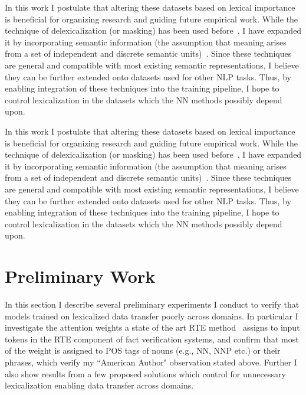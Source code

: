 \documentclass[compsoc,onecolumn]{IEEEtran}
\begin{document}
 
In this work I postulate that altering these datasets based on lexical importance is beneficial for organizing research and guiding future empirical work. While the technique of delexicalization (or masking) has been used before~\citep*{zeman2008cross}, I have expanded it by incorporating semantic information (the assumption that meaning arises from a set of independent and discrete semantic units)~\citep*{peyrard2019simple}. Since these techniques are general and compatible with most existing semantic representations, I believe they can be further extended onto datasets used for other NLP tasks. Thus, by enabling integration of these techniques into the training pipeline, I hope to control lexicalization in the datasets which the NN methods possibly depend upon. 



 
In this work I postulate that altering these datasets based on lexical importance is beneficial for organizing research and guiding future empirical work. While the technique of delexicalization (or masking) has been used before~\citep*{zeman2008cross}, I have expanded it by incorporating semantic information (the assumption that meaning arises from a set of independent and discrete semantic units)~\citep*{peyrard2019simple}. Since these techniques are general and compatible with most existing semantic representations, I believe they can be further extended onto datasets used for other NLP tasks. Thus, by enabling integration of these techniques into the training pipeline, I hope to control lexicalization in the datasets which the NN methods possibly depend upon. 


\section{Preliminary Work}


In this section I describe several preliminary experiments I conduct to verify that models trained on lexicalized data transfer poorly across domains. In particular I investigate the attention weights a state of the art RTE method~\citep*{parikh2016decomposable} assigns to input tokens in the RTE component of fact verification systems, and confirm that most of the weight is assigned to POS tags of nouns (e.g., NN, NNP etc.) or their phrases, which verify my ``American Author" observation stated above. Further I also show results from a few proposed solutions which control for unnecessary lexicalization enabling data transfer across domains.
\end{document}
